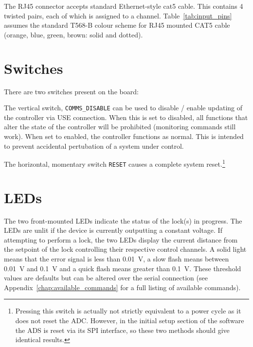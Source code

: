 \documentclass[11pt]{report}
\begin{document}
The RJ45 connector accepts standard Ethernet-style cat5 cable. This contains 4 twisted pairs, each of which is assigned to a channel. Table~\ref{tab:input_pins} assumes the standard T568-B colour scheme for RJ45 mounted CAT5 cable (orange, blue, green, brown: solid and dotted). 

\clearpage



\section{Switches} %
\label{sub:switches}

There are two switches present on the board:

The vertical switch, {\tt COMMS\_DISABLE} can be used to disable / enable updating of the controller via USE connection. When this is set to disabled, all functions that alter the state of the controller will be prohibited (monitoring commands still work). When set to enabled, the controller functions as normal. This is intended to prevent accidental pertubation of a system under control. 

The horizontal, momentary switch {\tt RESET} causes a complete system reset.\footnote{Pressing this switch is actually not strictly equivalent to a power cycle as it does not reset the ADC. However, in the initial setup section of the software the ADS is reset via its SPI interface, so these two methods should give identical results.}


\section{LEDs}

The two front-mounted LEDs indicate the status of the lock(s) in progress. The LEDs are unlit if the device is currently outputting a constant voltage. If attempting to perform a lock, the two LEDs display the current distance from the setpoint of the lock controlling their respective control channels. A solid light means that the error signal is less than \SI{0.01}{\volt}, a slow flash means between  \SI{0.01}{\volt} and  \SI{0.1}{\volt} and a quick flash means greater than  \SI{0.1}{\volt}. These threshold values are defaults but can be altered over the serial connection (see Appendix~\ref{chap:available_commands} for a full listing of available commands). 
\end{document}
